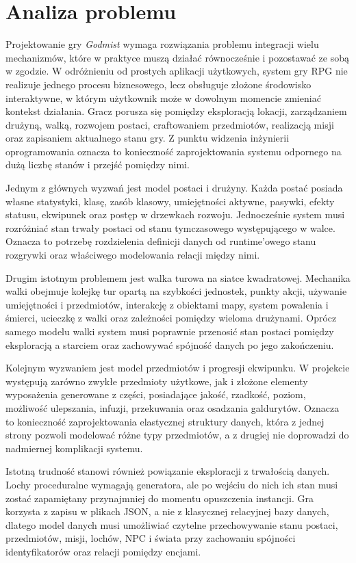 \section{Analiza problemu}
\label{sec:analiza-problemu}

Projektowanie gry \emph{Godmist} wymaga rozwiązania problemu integracji wielu mechanizmów, które w praktyce muszą działać równocześnie i pozostawać ze sobą w zgodzie. W odróżnieniu od prostych aplikacji użytkowych, system gry RPG nie realizuje jednego procesu biznesowego, lecz obsługuje złożone środowisko interaktywne, w którym użytkownik może w dowolnym momencie zmieniać kontekst działania. Gracz porusza się pomiędzy eksploracją lokacji, zarządzaniem drużyną, walką, rozwojem postaci, craftowaniem przedmiotów, realizacją misji oraz zapisaniem aktualnego stanu gry. Z punktu widzenia inżynierii oprogramowania oznacza to konieczność zaprojektowania systemu odpornego na dużą liczbę stanów i przejść pomiędzy nimi.

Jednym z głównych wyzwań jest model postaci i drużyny. Każda postać posiada własne statystyki, klasę, zasób klasowy, umiejętności aktywne, pasywki, efekty statusu, ekwipunek oraz postęp w drzewkach rozwoju. Jednocześnie system musi rozróżniać stan trwały postaci od stanu tymczasowego występującego w walce. Oznacza to potrzebę rozdzielenia definicji danych od runtime'owego stanu rozgrywki oraz właściwego modelowania relacji między nimi.

Drugim istotnym problemem jest walka turowa na siatce kwadratowej. Mechanika walki obejmuje kolejkę tur opartą na szybkości jednostek, punkty akcji, używanie umiejętności i przedmiotów, interakcję z obiektami mapy, system powalenia i śmierci, ucieczkę z walki oraz zależności pomiędzy wieloma drużynami. Oprócz samego modelu walki system musi poprawnie przenosić stan postaci pomiędzy eksploracją a starciem oraz zachowywać spójność danych po jego zakończeniu.

Kolejnym wyzwaniem jest model przedmiotów i progresji ekwipunku. W projekcie występują zarówno zwykłe przedmioty użytkowe, jak i złożone elementy wyposażenia generowane z części, posiadające jakość, rzadkość, poziom, możliwość ulepszania, infuzji, przekuwania oraz osadzania galdurytów. Oznacza to konieczność zaprojektowania elastycznej struktury danych, która z jednej strony pozwoli modelować różne typy przedmiotów, a z drugiej nie doprowadzi do nadmiernej komplikacji systemu.

Istotną trudność stanowi również powiązanie eksploracji z trwałością danych. Lochy proceduralne wymagają generatora, ale po wejściu do nich ich stan musi zostać zapamiętany przynajmniej do momentu opuszczenia instancji. Gra korzysta z zapisu w plikach JSON, a nie z klasycznej relacyjnej bazy danych, dlatego model danych musi umożliwiać czytelne przechowywanie stanu postaci, przedmiotów, misji, lochów, NPC i świata przy zachowaniu spójności identyfikatorów oraz relacji pomiędzy encjami.


